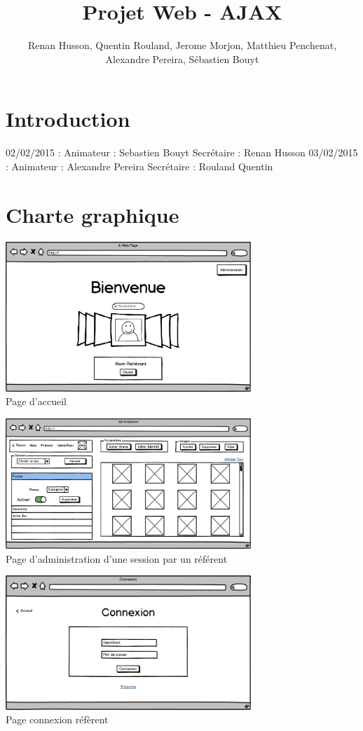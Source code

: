 \documentclass[12pt,a4paper]{report}
\author{Renan Husson, Quentin Rouland, Jerome Morjon, Matthieu Penchenat, Alexandre Pereira, Sébastien Bouyt}
\affil{Université Toulouse, Jean Jaurès - L3 MIASHS \\ Document D2 : Conceptio}
\begin{document}
\title{Projet Web - AJAX}
\maketitle
\renewcommand{\contentsname}{Sommaire}
\tableofcontents
\chapter*{Introduction}
02/02/2015 : Animateur : Sebastien Bouyt Secrétaire : Renan Husson 
03/02/2015 : Animateur : Alexandre Pereira Secrétaire : Rouland Quentin


\chapter{Charte graphique}
\includegraphics[width=350px]{../Maquette/Acceuil.png}\\
Page d’accueil

\includegraphics[width=350px]{../Maquette/Admin.png}\\
Page d’administration d’une session par un référent

\includegraphics[width=350px]{../Maquette/Connexion.png}\\
Page connexion réfèrent
\end{document}
